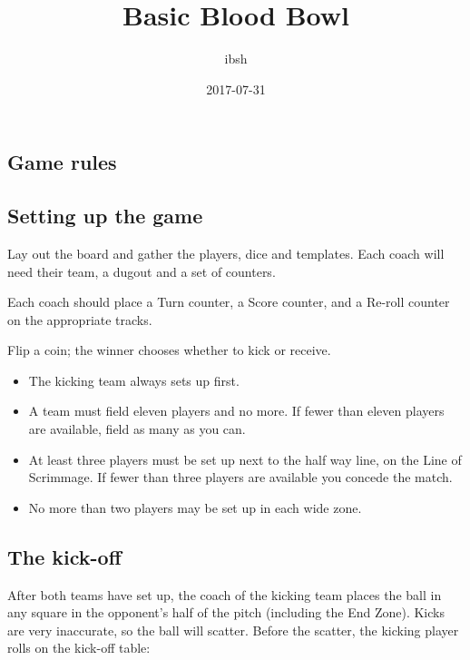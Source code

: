 \documentclass{article}
\title{Basic Blood Bowl}
\date{2017-07-31}
\author{ibsh}
\begin{document}
\maketitle
\thispagestyle{empty}

\begin{multicols}{2}

\section{Game rules}

\subsection{Setting up the game}
\par Lay out the board and gather the players, dice and templates. Each coach will need their team, a dugout and a set of counters.
\par Each coach should place a Turn counter, a Score counter, and a Re-roll counter on the appropriate tracks.
\par Flip a coin; the winner chooses whether to kick or receive.

\begin{itemize}
\item The kicking team always sets up first.
\item A team must field eleven players and no more. If fewer than eleven players are available, field as many as you can.
\item At least three players must be set up next to the half way line, on the Line of Scrimmage. If fewer than three players are available you concede the match.
\item No more than two players may be set up in each wide zone.
\end{itemize}

\subsection{The kick-off}
\par After both teams have set up, the coach of the kicking team places the ball in any square in the opponent's half of the pitch (including the End Zone). Kicks are very inaccurate, so the ball will scatter. Before the scatter, the kicking player rolls on the kick-off table:


\end{multicols}
\end{document}
